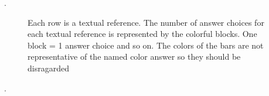 \documentclass[11pt, a4paper]{article}
\begin{document}
. 
\begin{figure}[H]
    \centering
    \caption{Each row is a textual reference. The number of answer choices for each textual reference is represented by the colorful blocks. One block = 1 answer choice and so on. The colors of the bars are not representative of the named color answer so they should be disragarded}
    \label{fig:textref}
\end{figure}.
\end{document}

